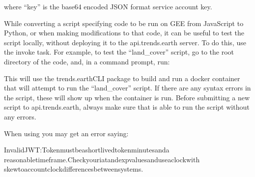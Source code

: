 \documentclass[letterpaper,10pt,english]{sphinxmanual}
\begin{document}
\begin{sphinxVerbatim}[commandchars=\\\{\}]
    
\end{sphinxVerbatim}

\sphinxAtStartPar
where “key” is the base64 encoded JSON format service account key.

\sphinxAtStartPar
While converting a script specifying code to be run on GEE from JavaScript to
Python, or when making modifications to that code, it can be useful to test the
script locally, without deploying it to the api.trends.earth server. To do
this, use the  invoke task. For example, to test the “land\_cover”
script, go to the root directory of the code, and, in a command
prompt, run:

\begin{sphinxVerbatim}[commandchars=\\\{\}]
  
\end{sphinxVerbatim}

\sphinxAtStartPar
This will use the trends.earth\sphinxhyphen{}CLI package to build and run a docker container
that will attempt to run the “land\_cover” script. If there are any syntax
errors in the script, these will show up when the container is run. Before
submitting a new script to api.trends.earth, always make sure that  is able to run the script without any errors.

\sphinxAtStartPar
When using  you may get an error saying:

\begin{sphinxVerbatim}[commandchars=\\\{\}]
InvalidJWT:Tokenmustbeashort\PYGZhy{}livedtokenminutesanda
reasonabletimeframe.Checkyouriatandexpvaluesanduseaclockwith
skewtoaccountclockdifferencesbetweensystems.
\end{sphinxVerbatim}
\end{document}
